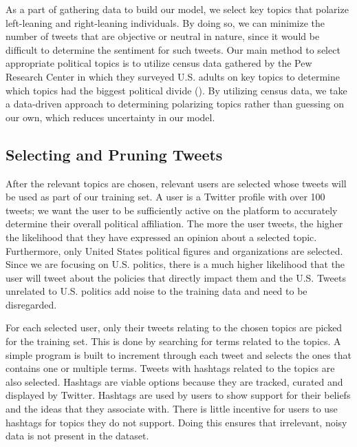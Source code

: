 \documentclass[letterpaper]{article} %
\begin{document}
As a part of gathering data to build our model, we select key topics that polarize left-leaning and right-leaning individuals. By doing so, we can minimize the number of tweets that are objective or neutral in nature, since it would be difficult to determine the sentiment for such tweets. Our main method to select appropriate political topics is to utilize census data gathered by the Pew Research Center in which they surveyed U.S. adults on key topics to determine which topics had the biggest political divide (\citeyear{pewresearch}). By utilizing census data, we take a data-driven approach to determining polarizing topics rather than guessing on our own, which reduces uncertainty in our model.

\subsection{Selecting and Pruning Tweets}

After the relevant topics are chosen, relevant users are selected whose tweets will be used as part of our training set. A user is a Twitter profile with over 100 tweets; we want the user to be sufficiently active on the platform to accurately determine their overall political affiliation. The more the user tweets, the higher the likelihood that they have expressed an opinion about a selected topic. Furthermore, only United States political figures and organizations are selected. Since we are focusing on U.S. politics, there is a much higher likelihood that the user will tweet about the policies that directly impact them and the U.S. Tweets unrelated to U.S. politics add noise to the training data and need to be disregarded.

For each selected user, only their tweets relating to the chosen topics are picked for the training set. This is done by searching for terms related to the topics. A simple program is built to increment through each tweet and selects the ones that contains one or multiple terms. Tweets with hashtags related to the topics are also selected. Hashtags are viable options because they are tracked, curated and displayed by Twitter. Hashtags are used by users to show support for their beliefs and the ideas that they associate with. There is little incentive for users to use hashtags for topics they do not support. Doing this ensures that irrelevant, noisy data is not present in the dataset.
\end{document}
